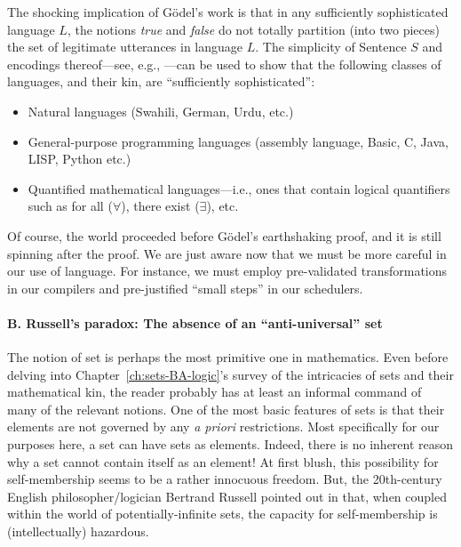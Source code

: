 The shocking implication of G\"{o}del's work is that in any
sufficiently sophisticated language $L$, the notions {\it true} and
{\it false} do not totally partition (into two pieces) the set of
legitimate utterances in language $L$.  The simplicity of Sentence $S$
and encodings thereof---see, e.g., \cite{Rosenberg09}---can be used to
show that the following classes of languages, and their kin, are
``sufficiently sophisticated'':
\begin{itemize}
\item
Natural languages (Swahili, German, Urdu, etc.)
\item
General-purpose programming languages (assembly language, Basic, C,
Java, LISP, Python etc.)
\item
Quantified mathematical languages---i.e., ones that contain logical
quantifiers such as {\sc for all} ($\forall$), {\sc there exist}
($\exists$), etc.
\end{itemize}

Of course, the world proceeded before G\"{o}del's earthshaking proof,
and it is still spinning after the proof.  We are just aware now that
we must be more careful in our use of language.  For instance, we must
employ pre-validated transformations in our compilers and
pre-justified ``small steps'' in our schedulers.


\paragraph{\small\sf B.  Russell's paradox: The absence of an ``anti-universal'' set}

The notion of set is perhaps the most primitive one in mathematics.
Even before delving into Chapter~\ref{ch:sets-BA-logic}'s survey of
the intricacies of sets and their mathematical kin, the reader
probably has at least an informal command of many of the relevant
notions.  One of the most basic features of sets is that their
elements are not governed by any {\it a priori} restrictions.  Most
specifically for our purposes here, a set can have sets as elements.
Indeed, there is no inherent reason why a set cannot contain itself as
an element!  At first blush, this possibility for self-membership
seems to be a rather innocuous freedom.  But, the 20th-century English
philosopher/logician Bertrand Russell 
pointed out in \cite{Russel03} that, when coupled within the world of
potentially-infinite sets, the capacity for self-membership is
(intellectually) hazardous.

